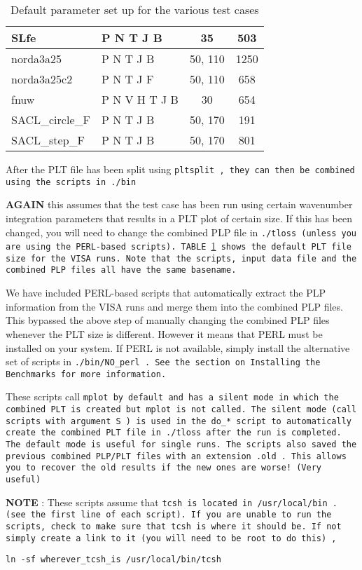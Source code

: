 \begin{table}
\begin{center}
\begin{tabular}{|l|l|c|c|}
 SLfe       	  & P N T J B       & 35       &   503  \\  \hline
 norda3a25  	  & P N T J B 	    & 50, 110  &   1250 \\  \hline
 norda3a25c2      & P N T J F 	    & 50, 110  &   658  \\  \hline
 fnuw      	  & P N V H T J B   & 30       &   654  \\  \hline
 SACL\_circle\_F  & P N T J B       & 50, 170  &   191  \\  \hline
 SACL\_step\_F 	  & P N T J B 	    & 50, 170  &   801  \\  \hline
\end{tabular}
\end{center}
\caption{Default parameter set up for the various test cases
	\label{parmrx} }
\end{table} 
 
After the PLT file has been split using \tt pltsplit \rm, they can then
be combined using the scripts in \tt ./bin \rm

{\bf AGAIN} this assumes that the test case has been run using certain
    wavenumber integration parameters that results in a PLT plot of
    certain size. If this has been changed, you will need to change
    the combined PLP file in \tt ./tloss \rm (unless you are using the
    PERL-based scripts). 
    TABLE~\ref{parmrx} shows the default PLT file size for the
    VISA runs. Note that the scripts, input data file and the combined
    PLP files all have the same basename.

    We have included PERL-based scripts that automatically extract the
    PLP information from the VISA runs and merge them into the
    combined PLP files. This bypassed the above step of manually
    changing the combined PLP files whenever the PLT size is
    different. However it means that PERL must be installed
    on your system. If PERL is not available, simply install the alternative
    set of scripts in \tt ./bin/NO\_perl \rm. See the section on
    \tt Installing the Benchmarks \rm for more information.

  
	These scripts call \tt mplot \rm by default and has a silent mode in
which the combined PLT is created but \tt mplot \rm is not called. The silent
mode (call scripts with argument \tt S \rm) 
is used in the \tt do\_* \rm script to automatically create the combined
PLT file in \tt ./tloss \rm after the run is completed. The default mode is
useful for single runs. The scripts also saved the previous combined PLP/PLT
files with an extension \tt .old \rm. This allows you to 
recover the old results if the new ones are worse! (Very useful)

{\bf NOTE} : These scripts assume that \tt tcsh \rm is located in
\tt /usr/local/bin \rm. (see the first line of each script). 
If you are unable to run the scripts, check to make sure that 
\tt tcsh \rm is where it should be. If not simply create a link to it
 (you will need to be \tt root \rm to do this) ,

\begin{verbatim}
ln -sf wherever_tcsh_is /usr/local/bin/tcsh
\end{verbatim}
\newpage


